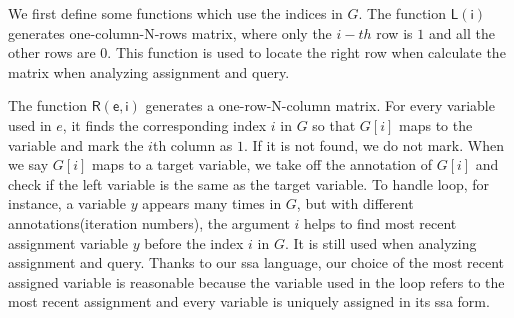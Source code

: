 We first define some functions which use the indices in $G$. 
The function $\mathsf{L(i)}$ generates one-column-N-rows  matrix, where only the $i-th$ row is $1$ and all the other rows are $0$. This function is used to locate the right row when calculate the matrix when analyzing assignment and query. 

The function $\mathsf{R(e, i)}$ generates a one-row-N-column matrix. For every variable used in $e$, it finds the corresponding index $i$ in $G$ so that $G[i]$ maps to the variable and mark the $i$th column as $1$. If it is not found, we do not mark. When we say $G[i]$ maps to a target variable, we take off the annotation of $G[i]$ and check if the left variable is the same as the target variable. To handle loop, for instance, a variable $y$ appears many times in $G$, but with different annotations(iteration numbers), the argument $i$ helps to find most recent assignment variable $y$ before the index $i$ in $G$. It is still used when analyzing assignment and query. Thanks to our ssa language, our choice of the most recent assigned variable is reasonable because the variable used in the loop refers to the most recent assignment and every variable is uniquely assigned in its ssa form. 

